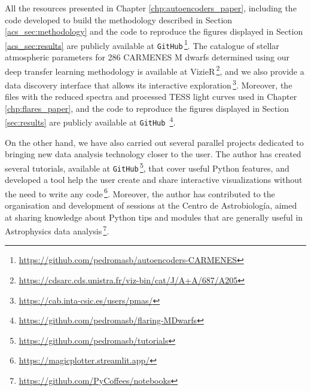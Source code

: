 All the resources presented in Chapter \ref{chp:autoencoders_paper}, including the code developed to build the methodology described in Section \ref{acs_sec:methodology} and the code to reproduce the figures displayed in Section \ref{acs_sec:results} are publicly available at \texttt{GitHub}\,\footnote{\url{https://github.com/pedromasb/autoencoders-CARMENES}}. The catalogue of stellar atmospheric parameters for 286 CARMENES M dwarfs determined using our deep transfer learning methodology is available at VizieR\,\footnote{\url{https://cdsarc.cds.unistra.fr/viz-bin/cat/J/A+A/687/A205}}, and we also provide a data discovery interface that allows its interactive exploration\,\footnote{\url{https://cab.inta-csic.es/users/pmas/}}. Moreover, the files with the reduced spectra and processed TESS light curves used in Chapter \ref{chp:flares_paper}, and the code to reproduce the figures displayed in Section \ref{sec:results} are publicly available at \texttt{GitHub\,}\footnote{\url{https://github.com/pedromasb/flaring-MDwarfs}}.

On the other hand, we have also carried out several parallel projects dedicated to bringing new data analysis technology closer to the user. The author has created several tutorials, available at \texttt{GitHub}\,\footnote{\url{https://github.com/pedromasb/tutorials}}, that cover useful Python features, and developed a tool help the user create and share interactive visualizations without the need to write any code\,\footnote{\url{https://magicplotter.streamlit.app/}}. Moreover, the author has contributed to the organisation and development of sessions at the Centro de Astrobiología, aimed at sharing knowledge about Python tips and modules that are generally useful in Astrophysics data analysis\,\footnote{\url{https://github.com/PyCoffees/notebooks}}.



